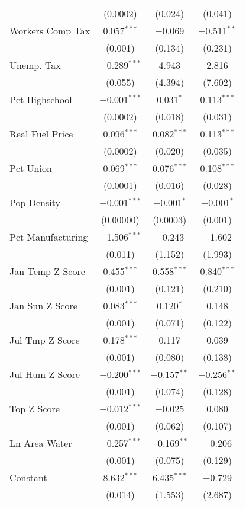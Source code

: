 \begin{table}[!htbp]
\begin{tabular}{@{\extracolsep{5pt}}lccc}
  & (0.0002) & (0.024) & (0.041) \\ 
  Workers Comp Tax & 0.057$^{***}$ & $-$0.069 & $-$0.511$^{**}$ \\ 
  & (0.001) & (0.134) & (0.231) \\ 
  Unemp. Tax & $-$0.289$^{***}$ & 4.943 & 2.816 \\ 
  & (0.055) & (4.394) & (7.602) \\ 
  Pct Highschool & $-$0.001$^{***}$ & 0.031$^{*}$ & 0.113$^{***}$ \\ 
  & (0.0002) & (0.018) & (0.031) \\ 
  Real Fuel Price & 0.096$^{***}$ & 0.082$^{***}$ & 0.113$^{***}$ \\ 
  & (0.0002) & (0.020) & (0.035) \\ 
  Pct Union & 0.069$^{***}$ & 0.076$^{***}$ & 0.108$^{***}$ \\ 
  & (0.0001) & (0.016) & (0.028) \\ 
  Pop Density & $-$0.001$^{***}$ & $-$0.001$^{*}$ & $-$0.001$^{*}$ \\ 
  & (0.00000) & (0.0003) & (0.001) \\ 
  Pct Manufacturing & $-$1.506$^{***}$ & $-$0.243 & $-$1.602 \\ 
  & (0.011) & (1.152) & (1.993) \\ 
  Jan Temp Z Score & 0.455$^{***}$ & 0.558$^{***}$ & 0.840$^{***}$ \\ 
  & (0.001) & (0.121) & (0.210) \\ 
  Jan Sun Z Score & 0.083$^{***}$ & 0.120$^{*}$ & 0.148 \\ 
  & (0.001) & (0.071) & (0.122) \\ 
  Jul Tmp Z Score & 0.178$^{***}$ & 0.117 & 0.039 \\ 
  & (0.001) & (0.080) & (0.138) \\ 
  Jul Hum Z Score & $-$0.200$^{***}$ & $-$0.157$^{**}$ & $-$0.256$^{**}$ \\ 
  & (0.001) & (0.074) & (0.128) \\ 
  Top Z Score & $-$0.012$^{***}$ & $-$0.025 & 0.080 \\ 
  & (0.001) & (0.062) & (0.107) \\ 
  Ln Area Water & $-$0.257$^{***}$ & $-$0.169$^{**}$ & $-$0.206 \\ 
  & (0.001) & (0.075) & (0.129) \\ 
  Constant & 8.632$^{***}$ & 6.435$^{***}$ & $-$0.729 \\ 
  & (0.014) & (1.553) & (2.687) \\ 

\end{tabular}
\end{table}
